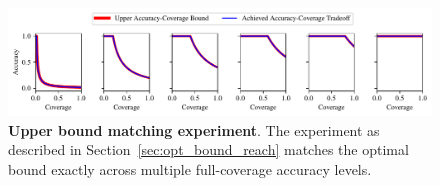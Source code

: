 \begin{figure}[t]
  \centering
	    \includegraphics[width=\linewidth]{figs/sptd_dp/bound_reachability.pdf}

\caption[Upper bound matching experiment.]{\textbf{Upper bound matching experiment}. The experiment as described in Section~\ref{sec:opt_bound_reach} matches the optimal bound exactly across multiple full-coverage accuracy levels.}
\label{fig:bound_reachability}
\end{figure}